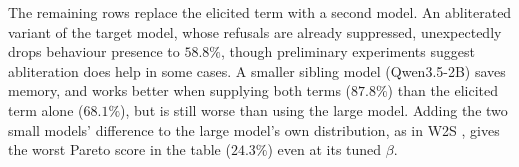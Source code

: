 \documentclass{article}
\begin{document}
The remaining rows replace the elicited term with a second model. An abliterated variant of the target model, whose refusals are already suppressed, unexpectedly drops behaviour presence to $58.8\%$, though preliminary experiments suggest abliteration does help in some cases. A smaller sibling model (Qwen3.5-2B) saves memory, and works better when supplying both terms ($87.8\%$) than the elicited term alone ($68.1\%$), but is still worse than using the large model. Adding the two small models' difference to the large model's own distribution, as in W2S \citep{zhao2024weak}, gives the worst Pareto score in the table ($24.3\%$) even at its tuned $\beta$.

\end{document}
